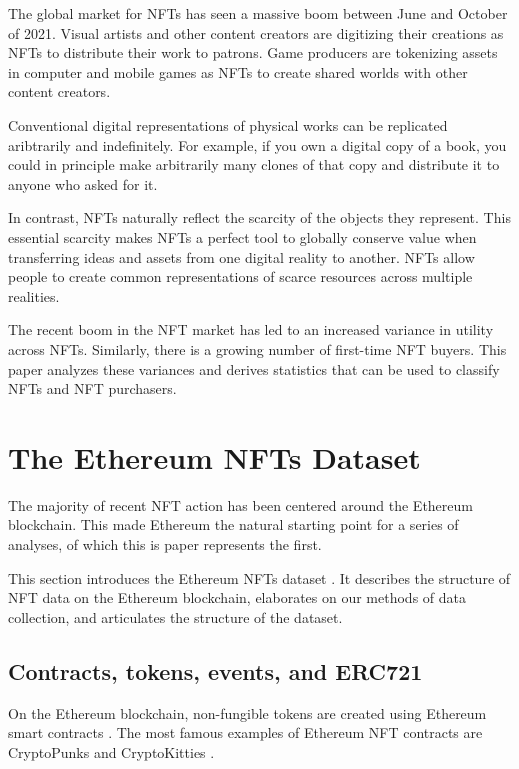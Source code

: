 \documentclass{article}
\begin{document}
The global market for NFTs has seen a massive boom between June and October of 2021. Visual artists and other content creators are digitizing their creations as NFTs to distribute their work to patrons. Game producers are tokenizing assets in computer and mobile games as NFTs to create shared worlds with other content creators.

Conventional digital representations of physical works can be replicated aribtrarily and indefinitely. For example, if you own a digital copy of a book, you could in principle make arbitrarily many clones of that copy and distribute it to anyone who asked for it.

In contrast, NFTs naturally reflect the scarcity of the objects they represent. This essential scarcity makes NFTs a perfect tool to globally conserve value when transferring ideas and assets from one digital reality to another. NFTs allow people to create common representations of scarce resources across multiple realities.

The recent boom in the NFT market \cite{reuters-nft-surge} has led to an increased variance in utility across NFTs. Similarly, there is a growing number of first-time NFT buyers. This paper analyzes these variances and derives statistics that can be used to classify NFTs and NFT purchasers.

\section{The Ethereum NFTs Dataset}

The majority of recent NFT action has been centered around the Ethereum blockchain. This made Ethereum the natural starting point for a series of analyses, of which this is paper represents the first.

This section introduces the Ethereum NFTs dataset \cite{ethereum-nfts}. It describes the structure of NFT data on the Ethereum blockchain, elaborates on our methods of data collection, and articulates the structure of the dataset.

\subsection{Contracts, tokens, events, and ERC721}

On the Ethereum blockchain, non-fungible tokens are created using Ethereum smart contracts \cite{ethereum-smart-contracts}. The most famous examples of Ethereum NFT contracts are CryptoPunks \cite{cryptopunks} and CryptoKitties \cite{cryptokitties}.
\end{document}
